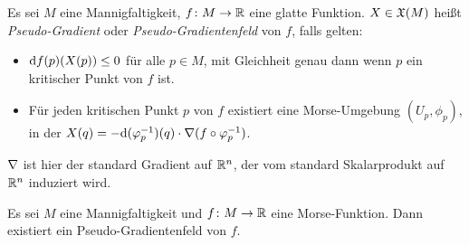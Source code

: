 

\begin{definition}
    \label{def: pseudo-gradient}
    Es sei $M$ eine Mannigfaltigkeit, $f \colon M \to { \mathbb R }$ eine glatte Funktion. $X \in { \mathfrak{X} } (M)$
    heißt \textit{Pseudo-Gradient} oder \textit{Pseudo-Gradientenfeld} von $f$, falls gelten:
    \begin{itemize}
        \item ${ \operatorname{d} } f (p) (X(p)) \leq 0$ für alle $p \in M$, mit Gleichheit genau dann wenn 
            $p$ ein kritischer Punkt von $f$ ist.
        \item Für jeden kritischen Punkt $p$ von $f$ existiert eine Morse-Umgebung 
            $(U_p, \phi_p)$, in der $X (q) = 
                - { \operatorname{d} } (\varphi_p^{-1}) (q) \cdot { \nabla } (f \circ \varphi_p^{-1})$.
    \end{itemize}
    ${ \nabla }$ ist hier der standard Gradient auf ${ \mathbb R }^n$, der vom standard Skalarprodukt auf ${ \mathbb R }^n$ 
    induziert wird.
\end{definition}

\begin{prop}
    Es sei $M$ eine Mannigfaltigkeit und $f \colon M \to { \mathbb R }$ eine Morse-Funktion. 
    Dann existiert ein Pseudo-Gradientenfeld von $f$.
\end{prop}

